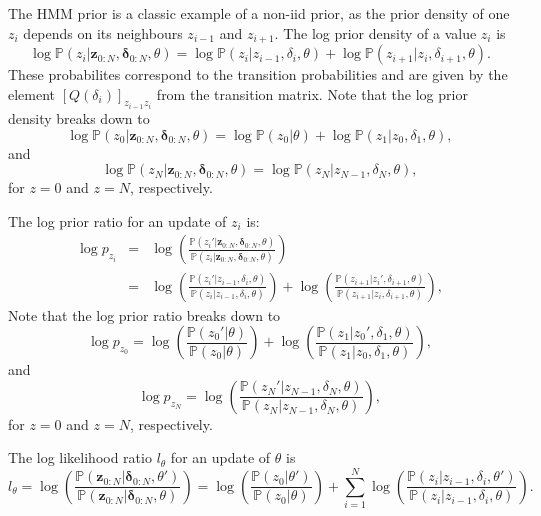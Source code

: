 \documentclass[a4paper,11pt]{article}
\def\p{\mathbb{P}}
\begin{document}
The HMM prior is a classic example of a non-iid prior, as the prior density of one $z_i$ depends on its neighbours $z_{i-1}$ and $z_{i+1}$. The log prior density of a value $z_i$ is
\begin{equation*}
 \log \p(z_i|\boldsymbol z_{0:N}, \boldsymbol \delta_{0:N}, \theta) = \log \p(z_i|z_{i-1}, \delta_i, \theta) + \log \p(z_{i+1}|z_{i}, \delta_{i+1}, \theta).
\end{equation*}
These probabilites correspond to the transition probabilities and are given by the element $[Q(\delta_i)]_{z_{i-1}z_i}$ from the transition matrix.
Note that the log prior density breaks down to
\begin{equation*}
 \log \p(z_0|\boldsymbol z_{0:N}, \boldsymbol \delta_{0:N}, \theta) = \log \p(z_0|\theta) + \log \p(z_{1}|z_{0}, \delta_{1}, \theta),
\end{equation*}
and
\begin{equation*}
 \log \p(z_N|\boldsymbol z_{0:N}, \boldsymbol \delta_{0:N}, \theta) = \log \p(z_N|z_{N-1}, \delta_N, \theta),
\end{equation*}
for $z=0$ and $z=N$, respectively.

The log prior ratio for an update of $z_i$ is:
\begin{eqnarray*}
 \log p_{z_i} &=& \log \left( \frac{\p(z_i'|\boldsymbol z_{0:N}, \boldsymbol \delta_{0:N}, \theta)}{\p(z_i|\boldsymbol z_{0:N}, \boldsymbol \delta_{0:N}, \theta)} \right)\\
 &=& \log \left(\frac{\p(z_i'|z_{i-1}, \delta_i, \theta)}{\p(z_i|z_{i-1}, \delta_i, \theta)} \right) + \log \left( \frac{\p(z_{i+1}|z_{i}', \delta_{i+1}, \theta)}{\p(z_{i+1}|z_{i}, \delta_{i+1}, \theta)} \right),
\end{eqnarray*}
Note that the log prior ratio breaks down to
\begin{equation*}
 \log p_{z_0} = \log \left(\frac{\p(z_0'|\theta)}{\p(z_0|\theta)} \right) + \log \left( \frac{\p(z_{1}|z_{0}', \delta_{1}, \theta)}{\p(z_{1}|z_{0}, \delta_{1}, \theta)} \right),
\end{equation*}
and
\begin{equation*}
 \log p_{z_N} = \log \left( \frac{\p(z_N'|z_{N-1}, \delta_N, \theta)}{\p(z_N|z_{N-1}, \delta_N, \theta)} \right),
\end{equation*}
for $z=0$ and $z=N$, respectively.

The log likelihood ratio $l_{\theta}$ for an update of $\theta$ is
\begin{equation}\label{eq:HMMUpdate}
 l_{\theta} = \log \left(\frac{\p(\boldsymbol z_{0:N} | \boldsymbol \delta_{0:N}, \theta')}{\p(\boldsymbol z_{0:N} | \boldsymbol \delta_{0:N}, \theta)} \right) = \log \left( \frac{\p(z_0 | \theta')}{\p(z_0 | \theta)} \right) + \sum_{i=1}^{N} \log \left( \frac{\p(z_i | z_{i-1}, \delta_i, \theta')}{\p(z_i | z_{i-1}, \delta_i, \theta)} \right).
\end{equation}
\end{document}
